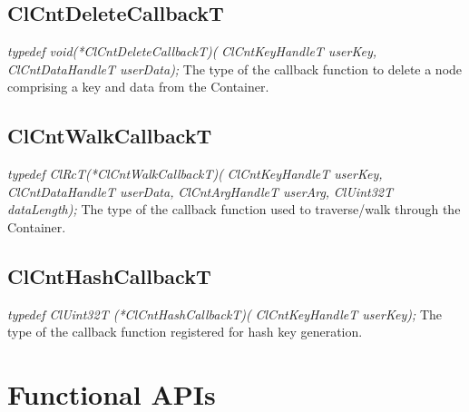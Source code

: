 \subsection{ClCntDeleteCallbackT}
\textit{typedef void(*ClCntDeleteCallbackT)(}
\newline\textit{ClCntKeyHandleT userKey, }
\newline\textit{ClCntDataHandleT userData);}
\newline
\newline
The type of the callback function to delete a node comprising a key and data from the Container.





\subsection{ClCntWalkCallbackT}
\textit{typedef ClRcT(*ClCntWalkCallbackT)(}
\newline \textit{ClCntKeyHandleT userKey, }
\newline \textit{ClCntDataHandleT userData, }
\newline \textit{ClCntArgHandleT userArg, }
\newline \textit{ClUint32T dataLength);}
\newline
\newline
The type of the callback function used to traverse/walk through the Container.



\subsection{ClCntHashCallbackT}
\textit{typedef ClUint32T (*ClCntHashCallbackT)(}
\newline \textit{ClCntKeyHandleT userKey);}
\newline
\newline
The type of the callback function registered for hash key generation.



\section{Functional APIs}
